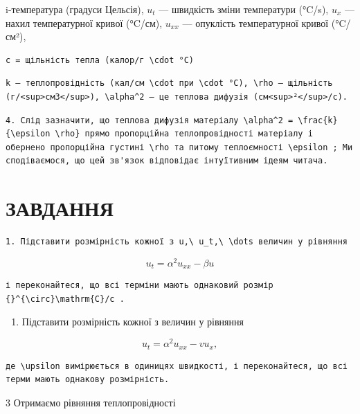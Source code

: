 \documentclass[
  ukrainian,
]{article}
\providecommand{\tightlist}{%
  \setlength{\itemsep}{0pt}\setlength{\parskip}{0pt}}
\begin{document}
i-температура (градуси Цельсія), \(u_t\) --- швидкість зміни температури
(°C/s), \(u_x\) --- нахил температурної кривої (°C/см), \(u_{xx}\) ---
опуклість температурної кривої (°C/см²),

\begin{verbatim}
c = щільність тепла (калор/г \cdot °C)
\end{verbatim}

\begin{verbatim}
k — теплопровідність (кал/см \cdot при \cdot °C), \rho — щільність (г/<sup>см3</sup>), \alpha^2 — це теплова дифузія (см<sup>²</sup>/с).
\end{verbatim}

\begin{verbatim}
4. Слід зазначити, що теплова дифузія матеріалу \alpha^2 = \frac{k}{\epsilon \rho} прямо пропорційна теплопровідності матеріалу і обернено пропорційна густині \rho та питому теплоємності \epsilon ; Ми сподіваємося, що цей зв'язок відповідає інтуїтивним ідеям читача.
\end{verbatim}

\section{ЗАВДАННЯ}\label{ux437ux430ux432ux434ux430ux43dux43dux44f-2}

\begin{verbatim}
1. Підставити розмірність кожної з u,\ u_t,\ \dots величин у рівняння
\end{verbatim}

\[
u_t = \alpha^2 u_{xx} - \beta u
\]

\begin{verbatim}
і переконайтеся, що всі терміни мають однаковий розмір {}^{\circ}\mathrm{C}/c .
\end{verbatim}

\begin{enumerate}
\def\labelenumi{\arabic{enumi}.}
\setcounter{enumi}{1}
\tightlist
\item
  Підставити розмірність кожної з величин у рівняння
\end{enumerate}

\[
u_t = \alpha^2 u_{xx} - v u_x,
\]

\begin{verbatim}
де \upsilon вимірюється в одиницях швидкості, і переконайтеся, що всі терми мають однакову розмірність.
\end{verbatim}

3 Отримаємо рівняння теплопровідності
\end{document}
